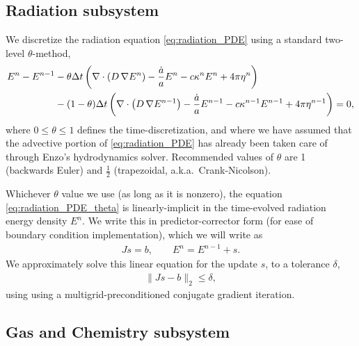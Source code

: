 \documentclass[letterpaper,10pt]{article}
\renewcommand{\(}{\left(}
\renewcommand{\)}{\right)}
\newcommand{\dt}{\Delta t}
\begin{document}
\subsection{Radiation subsystem}
\label{sec:rad_solve}

We discretize the radiation equation \eqref{eq:radiation_PDE} using a
standard two-level $\theta$-method,
\begin{align}
  \label{eq:radiation_PDE_theta}
  E^n - E^{n-1} &- \theta\dt\left(\nabla\cdot\(D\,\nabla E^n\) - \frac{\dot{a}}{a} E^n -
    c\kappa^n E^n + 4\pi\eta^n\right) \\ 
  \notag
  & - (1-\theta)\dt\left(\nabla\cdot\(D\,\nabla E^{n-1}\) - \frac{\dot{a}}{a} E^{n-1} -
    c\kappa^{n-1} E^{n-1} + 4\pi\eta^{n-1}\right) = 0,
\end{align}
where $0\le\theta\le 1$ defines the time-discretization, and where we
have assumed that the advective portion of \eqref{eq:radiation_PDE}
has already been taken care of through Enzo's hydrodynamics solver.
Recommended values of $\theta$ are 1 (backwards Euler) and $\frac12$
(trapezoidal, a.k.a.~Crank-Nicolson).  

Whichever $\theta$ value we use (as long as it is nonzero), the
equation \eqref{eq:radiation_PDE_theta} is linearly-implicit in the
time-evolved radiation energy density $E^n$.  We write this in
predictor-corrector form (for ease of boundary condition
implementation), which we will write as
\begin{align}
\label{eq:linear_system}
  J s = b, \qquad E^n = E^{n-1} + s.
\end{align}
We approximately solve this linear equation for the update $s$,
to a tolerance $\delta$,
\begin{align}
\label{eq:linear_system_approx}
  \| J s - b \|_2 \le \delta,
\end{align}
using using a multigrid-preconditioned conjugate gradient iteration.




\subsection{Gas and Chemistry subsystem}
\label{sec:analytic_solve}
\end{document}
